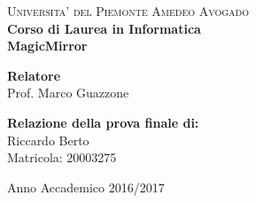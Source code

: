 \begin{titlepage}
\begin{center}

\textsc{\Large Universita' del Piemonte Amedeo Avogado}\\[0.7cm]

{\normalsize \bf Corso di Laurea in Informatica}\\[1cm]


{\Large \bfseries MagicMirror}\\[1cm]

\begin{minipage}[t]{0.4\textwidth}
\vspace{0.5cm}
\flushleft
{\bf Relatore}\\
Prof. Marco Guazzone\\
\end{minipage}
\begin{minipage}[t]{0.4\textwidth}
  \vspace{2.5cm}
\vfill
\flushright
{\bf Relazione della prova finale di:}\\
Riccardo Berto\\
Matricola: 20003275
\end{minipage}
\vfill
\vspace{0.5cm}
{\large Anno Accademico 2016/2017}
\vfill
\end{center}
\end{titlepage}
